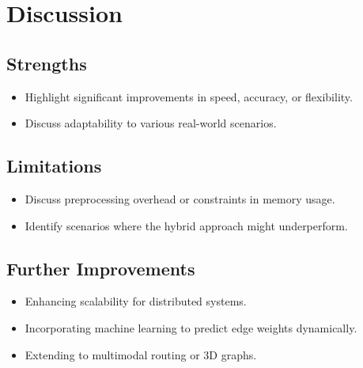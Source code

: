 \chapter{Discussion}

\section{Strengths}
	\begin{itemize}
		\item Highlight significant improvements in speed, accuracy, or flexibility.
		\item Discuss adaptability to various real-world scenarios.
	\end{itemize}
\section{Limitations}
	\begin{itemize}
		\item Discuss preprocessing overhead or constraints in memory usage.
		\item Identify scenarios where the hybrid approach might underperform.
	\end{itemize}
\section{Further Improvements}
	\begin{itemize}
		\item Enhancing scalability for distributed systems.
		\item Incorporating machine learning to predict edge weights dynamically.
		\item Extending to multimodal routing or 3D graphs.
	\end{itemize}